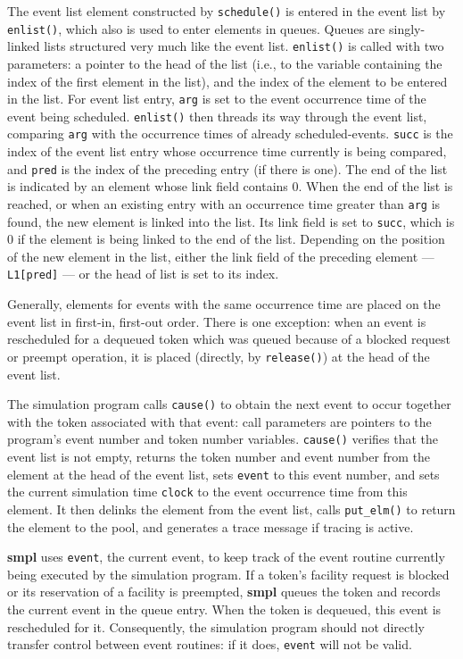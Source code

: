 The event list element constructed by \texttt{schedule()} is entered in the event
list by \texttt{enlist()}, which also is used to enter elements in queues. Queues are
singly-linked lists structured very much like the event list. \texttt{enlist()} is
called with two parameters: a pointer to the head of the list (i.e., to the
variable containing the index of the first element in the list), and the index
of the element to be entered in the list. For event list entry, \texttt{arg} is set to the
event occurrence time of the event being scheduled. \texttt{enlist()} then threads
its way through the event list, comparing \texttt{arg} with the occurrence times of
already scheduled-events. \texttt{succ} is the index of the event list entry whose
occurrence time currently is being compared, and \texttt{pred} is the index of the
preceding entry (if there is one). The end of the list is indicated by an
element whose link field contains 0. When the end of the list is reached, or
when an existing entry with an occurrence time greater than \texttt{arg} is found, the
new element is linked into the list. Its link field is set to \texttt{succ}, which is 0 if
the element is being linked to the end of the list. Depending on the position
of the new element in the list, either the link field of the preceding element
--- \texttt{L1[pred]} --- or the head of list is set to its index.

Generally, elements for events with the same occurrence time are placed
on the event list in first-in, first-out order. There is one exception: when an
event is rescheduled for a dequeued token which was queued because of a
blocked request or preempt operation, it is placed (directly, by \texttt{release()})
at the head of the event list.

The simulation program calls \texttt{cause()} to obtain the next event to occur
together with the token associated with that event: call parameters are
pointers to the program's event number and token number variables.
\texttt{cause()} verifies that the event list is not empty, returns the token number
and event number from the element at the head of the event list, sets \texttt{event}
to this event number, and sets the current simulation time \texttt{clock} to the event
occurrence time from this element. It then delinks the element from the event
list, calls \texttt{put\_elm()} to return the element to the pool, and generates a trace
message if tracing is active.

\textbf{smpl} uses \texttt{event}, the current event, to keep track of the event routine
currently being executed by the simulation program. If a token's facility
request is blocked or its reservation of a facility is preempted, \textbf{smpl} queues
the token and records the current event in the queue entry. When the token is
dequeued, this event is rescheduled for it. Consequently, the simulation
program should not directly transfer control between event routines: if it
does, \texttt{event} will not be valid.

